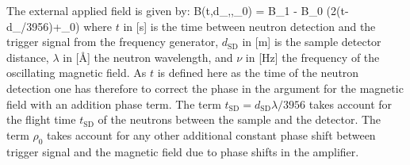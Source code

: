 The external applied field is given by: \BE
B(t,d_,\lambda,\rho_0) = B_1 - B_0
\cos(2\pi\nu(t-d_\lambda/3956)+\rho_0) \EE where $t$ in
[s] is the time between neutron detection and the trigger signal
from the frequency generator, $d_\text{SD}$ in [m] is the sample
detector distance, $\lambda $ in [\AA] the neutron wavelength, and
$\nu$ in [Hz] the frequency of the oscillating magnetic field. As
$t$ is defined here as the time of the neutron detection one has
therefore to correct the phase in the argument for the magnetic
field with an addition phase term. The term
$t_\text{SD}=d_\text{SD}\lambda/3956$ takes account for the flight
time $t_\text{SD}$ of the neutrons between the sample and the
detector. The term  $\rho_0$ takes account for any other
additional constant phase shift between trigger signal and the
magnetic field due to phase shifts in the amplifier.

